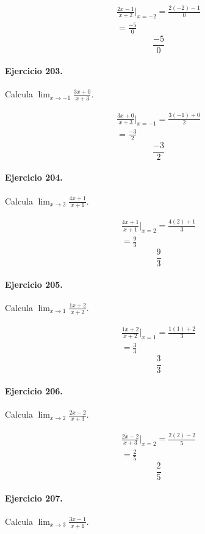 \documentclass[11pt,a4paper]{article}
\begin{document}
\[
\begin{aligned}
\frac{2x-1}{x+2}\Big|_{x=-2}=\frac{2(-2)-1}{0}\\
=\frac{-5}{0}
\end{aligned}
\]
\[\boxed{\frac{-5}{0}}\]


\paragraph{Ejercicio 203.} Calcula $\displaystyle\lim_{x\to -1}\frac{3x+0}{x+3}$. 

\[
\begin{aligned}
\frac{3x+0}{x+3}\Big|_{x=-1}=\frac{3(-1)+0}{2}\\
=\frac{-3}{2}
\end{aligned}
\]
\[\boxed{\frac{-3}{2}}\]


\paragraph{Ejercicio 204.} Calcula $\displaystyle\lim_{x\to 2}\frac{4x+1}{x+1}$. 

\[
\begin{aligned}
\frac{4x+1}{x+1}\Big|_{x=2}=\frac{4(2)+1}{3}\\
=\frac{9}{3}
\end{aligned}
\]
\[\boxed{\frac{9}{3}}\]


\paragraph{Ejercicio 205.} Calcula $\displaystyle\lim_{x\to 1}\frac{1x+2}{x+2}$. 

\[
\begin{aligned}
\frac{1x+2}{x+2}\Big|_{x=1}=\frac{1(1)+2}{3}\\
=\frac{3}{3}
\end{aligned}
\]
\[\boxed{\frac{3}{3}}\]


\paragraph{Ejercicio 206.} Calcula $\displaystyle\lim_{x\to 2}\frac{2x-2}{x+3}$. 

\[
\begin{aligned}
\frac{2x-2}{x+3}\Big|_{x=2}=\frac{2(2)-2}{5}\\
=\frac{2}{5}
\end{aligned}
\]
\[\boxed{\frac{2}{5}}\]


\paragraph{Ejercicio 207.} Calcula $\displaystyle\lim_{x\to 3}\frac{3x-1}{x+1}$. 
\end{document}
